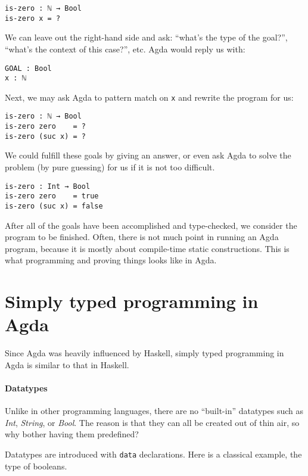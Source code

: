 \documentclass[\main/thesis.tex]{subfiles}
\begin{document}
\begin{lstlisting}
is-zero : ℕ → Bool
is-zero x = ?
\end{lstlisting}

We can leave out the right-hand side and ask:
``what's the type of the goal?'', ``what's the context of this case?'', etc.
Agda would reply us with:

\begin{lstlisting}
GOAL : Bool
x : ℕ
\end{lstlisting}

Next, we may ask Agda to pattern match on {\lstinline|x|} and rewrite the program for us:

\begin{lstlisting}
is-zero : ℕ → Bool
is-zero zero    = ?
is-zero (suc x) = ?
\end{lstlisting}

We could fulfill these goals by giving an answer,
or even ask Agda to solve the problem (by pure guessing) for us if it is not too difficult.

\begin{lstlisting}
is-zero : Int → Bool
is-zero zero    = true
is-zero (suc x) = false
\end{lstlisting}

After all of the goals have been accomplished and type-checked,
we consider the program to be finished.
Often, there is not much point in running an Agda program,
because it is mostly about compile-time static constructions.
This is what programming and proving things looks like in Agda.

\section{Simply typed programming in Agda}

Since Agda was heavily influenced by Haskell, simply typed programming in Agda
is similar to that in Haskell.

\paragraph{Datatypes}


Unlike in other programming languages, there are no ``built-in''
datatypes such as \textit{Int}, \textit{String}, or \textit{Bool}.
The reason is that they can all be created out of thin air, so why
bother having them predefined?

Datatypes are introduced with {\lstinline|data|} declarations.
Here is a classical example, the type of booleans.
\end{document}
